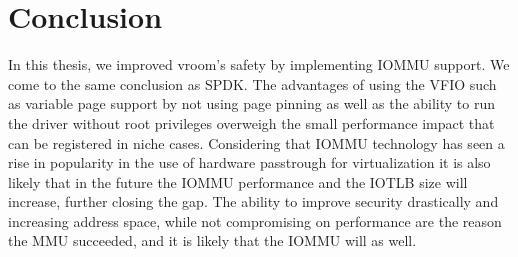 \chapter{Conclusion}

In this thesis, we improved vroom's safety by implementing IOMMU support. We come to the same conclusion as SPDK. The advantages of using the VFIO such as variable page support by not using page pinning as well as the ability to run the driver without root privileges overweigh the small performance impact that can be registered in niche cases. Considering that IOMMU technology has seen a rise in popularity in the use of hardware passtrough for virtualization it is also likely that in the future the IOMMU performance and the IOTLB size will increase, further closing the gap. The ability to improve security drastically and increasing address space, while not compromising on performance are the reason the MMU succeeded, and it is likely that the IOMMU will as well.